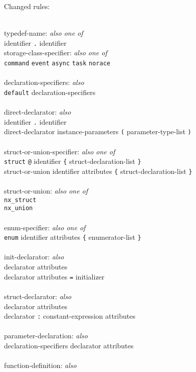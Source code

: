 \documentclass[11pt,letterpaper]{article}
\newcommand{\kw}[1]{{\tt #1}}
\newcommand{\grammarindent}{\hspace*{2cm}\= \\ \kill}
\begin{document}
Changed rules: 
\em \begin{tabbing}
\grammarindent
typedef-name: \emph{also one of}\\
\>	identifier \kw{.} identifier
\\
storage-class-specifier: \emph{also one of}\\
\>	\kw{command} \kw{event} \kw{async} \kw{task} \kw{norace}\\
\\
declaration-specifiers: \emph{also}\\
\>	\kw{default} declaration-specifiers\\
\\
direct-declarator: \emph{also}\\
\>	identifier \kw{.} identifier \\
\>	direct-declarator instance-parameters \kw{(} parameter-type-list \kw{)}\\
\\
struct-or-union-specifier: \emph{also one of}\\
\>	\kw{struct} \kw{@} identifier \kw{\{} struct-declaration-list \kw{\}}\\
\>	struct-or-union identifier attributes \kw{\{} struct-declaration-list \kw{\}}\\
\\
struct-or-union: \emph{also one of}\\
\>	\kw{nx\_struct}\\
\>	\kw{nx\_union}\\
\\
enum-specifier: \emph{also one of}\\
\>	\kw{enum} identifier attributes \kw{\{} enumerator-list \kw{\}}\\
\\
init-declarator: \emph{also}\\
\>	declarator attributes\\
\>	declarator attributes \kw{=} initializer\\
\\
struct-declarator: \emph{also}\\
\>	declarator attributes\\
\>	declarator \kw{:} constant-expression attributes \\
\\
parameter-declaration: \emph{also}\\
\>	declaration-specifiers declarator attributes\\
\\
function-definition: \emph{also}\\

\end{tabbing}
\end{document}
